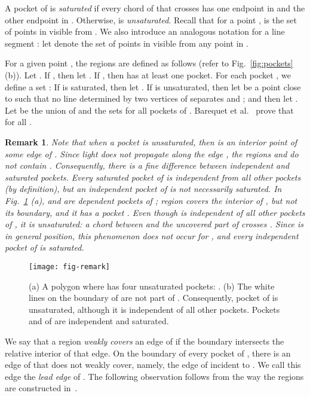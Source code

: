 \documentclass[12pt]{article}
\newtheorem{remark}{Remark}
\begin{document}
A pocket  of  is \emph{saturated} if every chord of  that crosses  has one endpoint in  and the other endpoint in . Otherwise,  is \emph{unsaturated}. Recall that for a point ,  is the set of points in  visible from . We also introduce an analogous notation for a line segment : let  denote the set of points in  visible from any point in .

For a given point , the regions  are defined as follows (refer to Fig.~\ref{fig:pockets}(b)). Let . If ,
then let . If , then  has at least one pocket.
For each pocket , we define a set :
If  is saturated, then let .
If  is unsaturated, then let  be a point close to 
such that no line determined by two vertices of  separates  and ;
and then let . Let  be the union of 
and the sets  for all pockets  of . Barequet et al.~\cite{Us} prove
that  for all .

\begin{remark}\label{remark:1}{\rm
Note that when a pocket  is unsaturated, then  is an interior point of
some edge  of . Since light does not propagate along the edge , the regions  and  do not contain . Consequently, there is a fine difference between \emph{independent} and \emph{saturated} pockets. Every saturated pocket of  is independent from all other pockets (by definition), but an independent pocket of  is not necessarily saturated. In Fig.~\ref{fig:remark} (a),  and  are dependent
pockets of ; region  covers the interior of , but not its boundary, and it
has a pocket . Even though  is independent of all other pockets of ,
it is unsaturated: a chord between  and the uncovered part of  crosses .
Since  is in general position, this phenomenon does not occur for , and
every independent pocket of  is saturated.}
\end{remark}

\begin{figure}[htp]
  \centering
  \texttt{[image: fig-remark]}
  \caption{\label{fig:remark}
(a) A polygon  where  has four unsaturated pockets: .
(b) The white lines on the boundary of  are not part of .
Consequently, pocket  of  is unsaturated, although it is independent of all other pockets.
Pockets  and  of  are independent and saturated.}
\end{figure}

We say that a region  \emph{weakly covers} an edge of  if the boundary 
intersects the relative interior of that edge. On the boundary of every pocket  of ,
there is an edge of  that  does not weakly cover, namely, the edge of  incident to .
We call this edge the \emph{lead edge} of . The following observation follows from
the way the regions  are constructed in~\cite{Us}.
\end{document}
